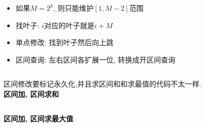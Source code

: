 
\begin{itemize}
	\item 如果$M = 2^k$, 则只能维护$[1, M - 2]$范围
	\item 找叶子: $i$对应的叶子就是$i + M$
	\item 单点修改: 找到叶子然后向上跳
	\item 区间查询: 左右区间各扩展一位, 转换成开区间查询
	\inputminted{cpp}{../src/datastructure/非递归线段树单点修改.cpp}

\end{itemize}
	
区间修改要标记永久化,并且求区间和和求最值的代码不太一样. \\

\textbf{区间加, 区间求和}
\inputminted{cpp}{../src/datastructure/非递归线段树区间加区间求和.cpp}

\textbf{区间加, 区间求最大值}
\inputminted{cpp}{../src/datastructure/非递归线段树区间加区间求最大值.cpp}